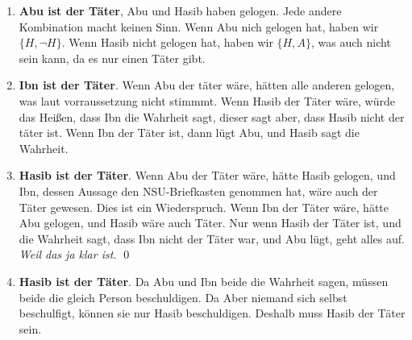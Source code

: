 \pagebreak 

\begin{enumerate}[1.]
	\item \textbf{Abu ist der Täter}, Abu und Hasib haben gelogen. Jede andere Kombination macht keinen Sinn.
		  Wenn Abu nich gelogen hat, haben wir $\{H,\lnot H\}$. Wenn Hasib nicht gelogen hat, haben wir $\{H,A\}$, was 
		  auch nicht sein kann, da es nur einen Täter gibt.
	\item \textbf{Ibn ist der Täter}. Wenn Abu der täter wäre, hätten alle anderen gelogen, was laut vorraussetzung 
	nicht stimmmt. Wenn Hasib der Täter wäre, würde das Heißen, dass Ibn die Wahrheit sagt, dieser sagt aber, dass Hasib 
	nicht der täter ist. Wenn Ibn der Täter ist, dann lügt Abu, und Hasib sagt die Wahrheit.
	\item \textbf{Hasib ist der Täter}. Wenn Abu der Täter wäre, hätte Hasib gelogen, und Ibn, dessen Aussage den 
	NSU-Briefkasten genommen hat, wäre auch der Täter gewesen. Dies ist ein Wiederspruch. Wenn Ibn der Täter wäre, hätte 
	Abu gelogen, und Hasib wäre auch Täter. Nur wenn Hasib der Täter ist, und die Wahrheit sagt, dass Ibn nicht der Täter 
	war, und Abu lügt, geht alles auf. \emph{Weil das ja klar ist.} \qed
	\item \textbf{Hasib ist der Täter}. Da Abu und Ibn beide die Wahrheit sagen, müssen beide die gleich Person 
	beschuldigen. Da Aber niemand sich selbst beschulfigt, können sie nur Hasib beschuldigen. Deshalb muss Hasib der 
	Täter sein.
\end{enumerate}




\vfill\centering

